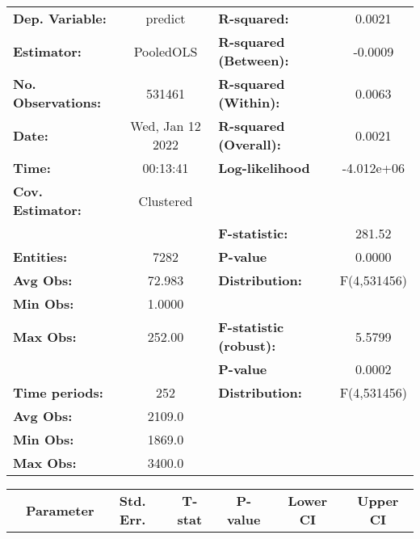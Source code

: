 \begin{center}
\begin{tabular}{lclc}
\toprule
\textbf{Dep. Variable:}    &      predict       & \textbf{  R-squared:         }   &      0.0021      \\
\textbf{Estimator:}        &     PooledOLS      & \textbf{  R-squared (Between):}  &     -0.0009      \\
\textbf{No. Observations:} &       531461       & \textbf{  R-squared (Within):}   &      0.0063      \\
\textbf{Date:}             &  Wed, Jan 12 2022  & \textbf{  R-squared (Overall):}  &      0.0021      \\
\textbf{Time:}             &      00:13:41      & \textbf{  Log-likelihood     }   &    -4.012e+06    \\
\textbf{Cov. Estimator:}   &     Clustered      & \textbf{                     }   &                  \\
\textbf{}                  &                    & \textbf{  F-statistic:       }   &      281.52      \\
\textbf{Entities:}         &        7282        & \textbf{  P-value            }   &      0.0000      \\
\textbf{Avg Obs:}          &       72.983       & \textbf{  Distribution:      }   &   F(4,531456)    \\
\textbf{Min Obs:}          &       1.0000       & \textbf{                     }   &                  \\
\textbf{Max Obs:}          &       252.00       & \textbf{  F-statistic (robust):} &      5.5799      \\
\textbf{}                  &                    & \textbf{  P-value            }   &      0.0002      \\
\textbf{Time periods:}     &        252         & \textbf{  Distribution:      }   &   F(4,531456)    \\
\textbf{Avg Obs:}          &       2109.0       & \textbf{                     }   &                  \\
\textbf{Min Obs:}          &       1869.0       & \textbf{                     }   &                  \\
\textbf{Max Obs:}          &       3400.0       & \textbf{                     }   &                  \\
\bottomrule
\end{tabular}
\begin{tabular}{lcccccc}
                & \textbf{Parameter} & \textbf{Std. Err.} & \textbf{T-stat} & \textbf{P-value} & \textbf{Lower CI} & \textbf{Upper CI}  \\

\end{tabular}
\end{center}
